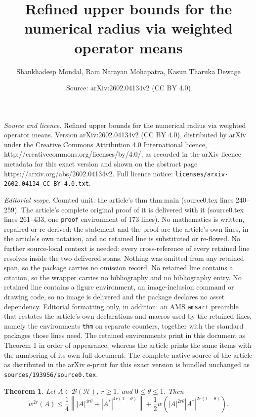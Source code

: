 \documentclass[10pt,a4paper]{amsart}
\title{Refined upper bounds for the numerical radius via weighted operator means}
\author{Shankhadeep Mondal, Ram Narayan Mohapatra, Kasun Tharuka Dewage}
\date{Source: arXiv:2602.04134v2 (CC BY 4.0)}
\newtheorem{thm}{Theorem}
\begin{document}
\maketitle

\noindent\emph{Source and licence.} Refined upper bounds for the numerical radius via weighted operator means. Version arXiv:2602.04134v2 (CC BY 4.0), distributed by arXiv under the Creative Commons Attribution 4.0 International licence, http://creativecommons.org/licenses/by/4.0/, as recorded in the arXiv licence metadata for this exact version and shown on the abstract page https://arxiv.org/abs/2602.04134v2. Full licence notice: \texttt{licenses/arxiv-2602.04134-CC-BY-4.0.txt}.\par\smallskip

\noindent\textit{Editorial scope.} Counted unit: the article's thm thm:main (source0.tex lines 240--259). The article's complete original proof of it is delivered with it (source0.tex lines 261--433, one \texttt{proof} environment of 173 lines). No mathematics is written, repaired or re-derived: the statement and the proof are the article's own lines, in the article's own notation, and no retained line is substituted or re-flowed.  No further source-local context is needed: every cross-reference of every retained line resolves inside the two delivered spans.  Nothing was omitted from any retained span, so the package carries no omission record.  No retained line contains a citation, so the wrapper carries no bibliography and no bibliography entry.  No retained line contains a figure environment, an image-inclusion command or drawing code, so no image is delivered and the package declares no asset dependency.  Editorial formatting only, in addition: an AMS \texttt{amsart} preamble that restates the article's own declarations and macros used by the retained lines, namely the environments \texttt{thm} on separate counters, together with the standard packages those lines need.  The retained environments print in this document as Theorem 1 in order of appearance, whereas the article prints the same items with the numbering of its own full document.  The complete native source of the article as distributed in the arXiv e-print for this exact version is bundled unchanged as \texttt{sources/193956/source0.tex}.
\begin{thm}\label{thm:main}
Let $A\in\mathcal{B}(\mathcal{H})$, $r\geq 1$, and
$0\leq \theta\leq 1$. Then
\[
w^{2r}(A)
\leq
\frac14
\left\|
|A|^{4r\theta}
+
|A^*|^{4r(1-\theta)}
\right\|
+
\frac12
w\!\left(
|A|^{2r\theta}
|A^*|^{2r(1-\theta)}
\right).
\]
\end{thm}
\end{document}
